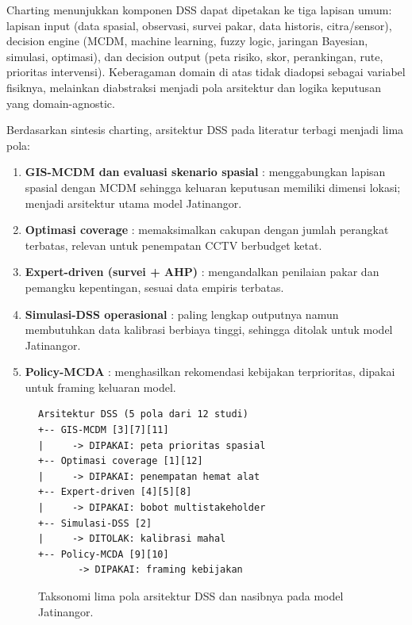\documentclass[conference]{IEEEtran}
\begin{document}
Charting menunjukkan komponen DSS dapat dipetakan ke tiga lapisan umum: lapisan input (data spasial, observasi, survei pakar, data historis, citra/sensor), decision engine (MCDM, machine learning, fuzzy logic, jaringan Bayesian, simulasi, optimasi), dan decision output (peta risiko, skor, perankingan, rute, prioritas intervensi). Keberagaman domain di atas tidak diadopsi sebagai variabel fisiknya, melainkan diabstraksi menjadi pola arsitektur dan logika keputusan yang domain-agnostic.

Berdasarkan sintesis charting, arsitektur DSS pada literatur terbagi menjadi lima pola:

\begin{enumerate}
\item \textbf{GIS-MCDM dan evaluasi skenario spasial} \cite{feizizadeh2025,kabashkin2025,zheng2025}: menggabungkan lapisan spasial dengan MCDM sehingga keluaran keputusan memiliki dimensi lokasi; menjadi arsitektur utama model Jatinangor.
\item \textbf{Optimasi coverage} \cite{wang2025,yuhang2025}: memaksimalkan cakupan dengan jumlah perangkat terbatas, relevan untuk penempatan CCTV berbudget ketat.
\item \textbf{Expert-driven (survei + AHP)} \cite{ahmed2022,choi2025,baddour2026}: mengandalkan penilaian pakar dan pemangku kepentingan, sesuai data empiris terbatas.
\item \textbf{Simulasi-DSS operasional} \cite{gonzalez2024}: paling lengkap outputnya namun membutuhkan data kalibrasi berbiaya tinggi, sehingga ditolak untuk model Jatinangor.
\item \textbf{Policy-MCDA} \cite{almassawa2024,shiddiqy2025}: menghasilkan rekomendasi kebijakan terprioritas, dipakai untuk framing keluaran model.
\end{enumerate}

\begin{figure}[!t]
\centering
\begin{small}
\begin{verbatim}
Arsitektur DSS (5 pola dari 12 studi)
+-- GIS-MCDM [3][7][11]
|     -> DIPAKAI: peta prioritas spasial
+-- Optimasi coverage [1][12]
|     -> DIPAKAI: penempatan hemat alat
+-- Expert-driven [4][5][8]
|     -> DIPAKAI: bobot multistakeholder
+-- Simulasi-DSS [2]
|     -> DITOLAK: kalibrasi mahal
+-- Policy-MCDA [9][10]
       -> DIPAKAI: framing kebijakan
\end{verbatim}
\end{small}
\caption{Taksonomi lima pola arsitektur DSS dan nasibnya pada model Jatinangor.}
\label{fig:taksonomi}
\end{figure}
\end{document}

